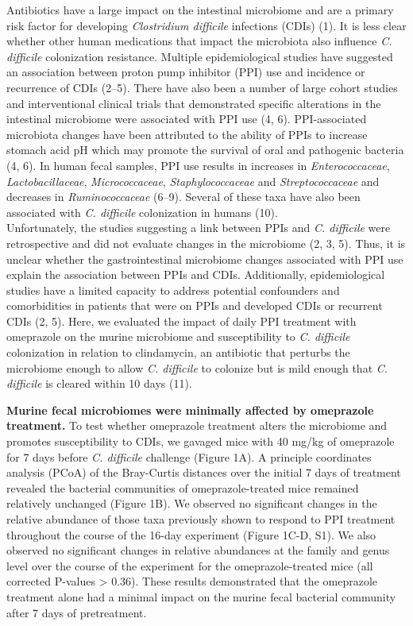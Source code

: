 \documentclass[11pt,]{article}
\begin{document}
Antibiotics have a large impact on the intestinal microbiome and are a
primary risk factor for developing \emph{Clostridium difficile}
infections (CDIs) (1). It is less clear whether other human medications
that impact the microbiota also influence \emph{C. difficile}
colonization resistance. Multiple epidemiological studies have suggested
an association between proton pump inhibitor (PPI) use and incidence or
recurrence of CDIs (2--5). There have also been a number of large cohort
studies and interventional clinical trials that demonstrated specific
alterations in the intestinal microbiome were associated with PPI use
(4, 6). PPI-associated microbiota changes have been attributed to the
ability of PPIs to increase stomach acid pH which may promote the
survival of oral and pathogenic bacteria (4, 6). In human fecal samples,
PPI use results in increases in \emph{Enterococcaceae},
\emph{Lactobacillaceae}, \emph{Micrococcaceae}, \emph{Staphylococcaceae}
and \emph{Streptococcaceae} and decreases in \emph{Ruminococcaceae}
(6--9). Several of these taxa have also been associated with \emph{C.
difficile} colonization in humans (10).\\
Unfortunately, the studies suggesting a link between PPIs and \emph{C.
difficile} were retrospective and did not evaluate changes in the
microbiome (2, 3, 5). Thus, it is unclear whether the gastrointestinal
microbiome changes associated with PPI use explain the association
between PPIs and CDIs. Additionally, epidemiological studies have a
limited capacity to address potential confounders and comorbidities in
patients that were on PPIs and developed CDIs or recurrent CDIs (2, 5).
Here, we evaluated the impact of daily PPI treatment with omeprazole on
the murine microbiome and susceptibility to \emph{C. difficile}
colonization in relation to clindamycin, an antibiotic that perturbs the
microbiome enough to allow \emph{C. difficile} to colonize but is mild
enough that \emph{C. difficile} is cleared within 10 days (11).

\textbf{Murine fecal microbiomes were minimally affected by omeprazole
treatment. } To test whether omeprazole treatment alters the microbiome
and promotes susceptibility to CDIs, we gavaged mice with 40 mg/kg of
omeprazole for 7 days before \emph{C. difficile} challenge (Figure 1A).
A principle coordinates analysis (PCoA) of the Bray-Curtis distances
over the initial 7 days of treatment revealed the bacterial communities
of omeprazole-treated mice remained relatively unchanged (Figure 1B). We
observed no significant changes in the relative abundance of those taxa
previously shown to respond to PPI treatment throughout the course of
the 16-day experiment (Figure 1C-D, S1). We also observed no significant
changes in relative abundances at the family and genus level over the
course of the experiment for the omeprazole-treated mice (all corrected
P-values \textgreater{} 0.36). These results demonstrated that the
omeprazole treatment alone had a minimal impact on the murine fecal
bacterial community after 7 days of pretreatment.
\end{document}
